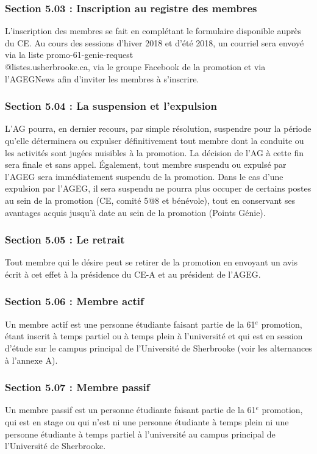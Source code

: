 \subsubsection*{Section 5.03 : Inscription au registre des membres}

L’inscription des membres se fait en complétant le formulaire disponible auprès du CE. Au cours des sessions d’hiver 2018 et d’été 2018, un courriel sera envoyé via la liste promo-61-genie-request\\@listes.usherbrooke.ca, via le groupe Facebook de la promotion et via l’AGEGNews afin d’inviter les membres à s’inscrire. 


\subsubsection*{Section 5.04 : La suspension et l'expulsion}
L'AG pourra, en dernier recours, par simple résolution, suspendre pour la période qu'elle déterminera ou expulser définitivement tout membre dont la conduite ou les activités sont jugées nuisibles à la promotion. La décision de l'AG à cette fin sera finale et sans appel. Également, tout membre suspendu ou expulsé par l’AGEG sera immédiatement suspendu de la promotion. Dans le cas d’une expulsion par l’AGEG, il sera suspendu ne pourra plus occuper de certains postes au sein de la promotion (CE, comité 5@8 et bénévole), tout en conservant ses avantages acquis jusqu’à date au sein de la promotion (Points Génie). 

\subsubsection*{Section 5.05 : Le retrait}
Tout membre qui le désire peut se retirer de la promotion en envoyant un avis écrit à cet effet à la présidence du CE-A et au président de l'AGEG. 

\subsubsection*{Section 5.06 : Membre actif}
Un membre actif est une personne étudiante faisant partie de la 61$^e$ promotion, étant inscrit à temps partiel ou à temps plein à l’université et qui est en session d’étude sur le campus principal de l'Université de Sherbrooke (voir les alternances à l’annexe A).

\subsubsection*{Section 5.07 : Membre passif}
Un membre passif est un personne étudiante faisant partie de la 61$^e$ promotion, qui est en stage ou qui n’est ni une personne étudiante à temps plein ni une personne étudiante à temps partiel à l’université au campus principal de l'Université de Sherbrooke.